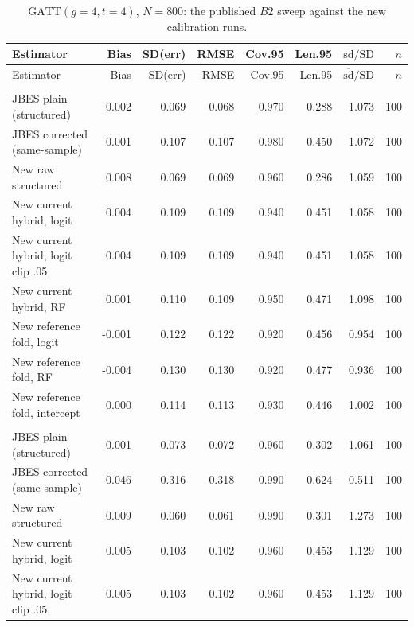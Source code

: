 {\footnotesize
\begin{longtable}{lrrrrrrr}
\caption{$\mathrm{GATT}(g{=}4,t{=}4)$, $N=800$: the published $B2$ sweep against the new calibration runs.}\label{tab:repro800}\\
\toprule
Estimator & Bias & SD(err) & RMSE & Cov.95 & Len.95 & $\overline{\mathrm{sd}}/\mathrm{SD}$ & $n$ \\
\midrule

\endfirsthead
\toprule
Estimator & Bias & SD(err) & RMSE & Cov.95 & Len.95 & $\overline{\mathrm{sd}}/\mathrm{SD}$ & $n$ \\
\midrule

\endhead
\bottomrule
\endlastfoot
\multicolumn{8}{l}{\textit{baseline, degree $d=1$}} \\
\quad JBES plain (structured) & 0.002 & 0.069 & 0.068 & 0.970 & 0.288 & 1.073 & 100 \\
\quad JBES corrected (same-sample) & 0.001 & 0.107 & 0.107 & 0.980 & 0.450 & 1.072 & 100 \\
\quad New raw structured & 0.008 & 0.069 & 0.069 & 0.960 & 0.286 & 1.059 & 100 \\
\quad New current hybrid, logit & 0.004 & 0.109 & 0.109 & 0.940 & 0.451 & 1.058 & 100 \\
\quad New current hybrid, logit clip .05 & 0.004 & 0.109 & 0.109 & 0.940 & 0.451 & 1.058 & 100 \\
\quad New current hybrid, RF & 0.001 & 0.110 & 0.109 & 0.950 & 0.471 & 1.098 & 100 \\
\quad New reference fold, logit & -0.001 & 0.122 & 0.122 & 0.920 & 0.456 & 0.954 & 100 \\
\quad New reference fold, RF & -0.004 & 0.130 & 0.130 & 0.920 & 0.477 & 0.936 & 100 \\
\quad New reference fold, intercept & 0.000 & 0.114 & 0.113 & 0.930 & 0.446 & 1.002 & 100 \\
\addlinespace
\multicolumn{8}{l}{\textit{baseline, degree $d=2$}} \\
\quad JBES plain (structured) & -0.001 & 0.073 & 0.072 & 0.960 & 0.302 & 1.061 & 100 \\
\quad JBES corrected (same-sample) & -0.046 & 0.316 & 0.318 & 0.990 & 0.624 & 0.511 & 100 \\
\quad New raw structured & 0.009 & 0.060 & 0.061 & 0.990 & 0.301 & 1.273 & 100 \\
\quad New current hybrid, logit & 0.005 & 0.103 & 0.102 & 0.960 & 0.453 & 1.129 & 100 \\
\quad New current hybrid, logit clip .05 & 0.005 & 0.103 & 0.102 & 0.960 & 0.453 & 1.129 & 100 \\

\end{longtable}}
